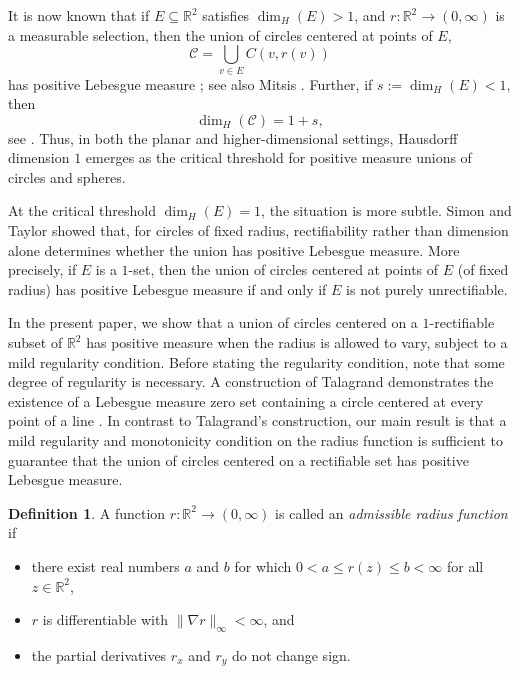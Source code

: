 \documentclass[12pt]{amsart}
\theoremstyle{definition}
\newtheorem{definition}[theorem]{Definition}
\numberwithin{equation}{section}
\newcommand{\R}{\mathbb{R}}
\begin{document}
It is now known that if $E\subseteq \R^2$ satisfies $\dim_H(E) >1$, 
and $r:\R^2\rightarrow (0,\infty)$ is a measurable selection, 
then the union of circles centered at points of $E$, 
$$\mathcal{C}= \bigcup_{v\in E}C(v,r(v))$$
has positive Lebesgue measure \cite{Wolff2000}; see also Mitsis \cite{Mitsis1999}. Further, if $s:= \dim_H(E)<1$, then 
$$\dim_H(\mathcal{C}) = 1+s,$$ see \cite{Oberlin2007}. 
Thus, in both the planar and higher-dimensional settings, Hausdorff dimension $1$ emerges as the critical threshold for positive measure unions of circles and spheres.


At the critical threshold $\dim_H(E)=1$, the situation is more subtle. Simon and Taylor \cite{ST2022} showed that, for circles of fixed radius, rectifiability rather than dimension alone determines whether the union has positive Lebesgue measure. More precisely, 
if $E$ is a $1$-set, then the union of circles centered at points of $E$ (of fixed radius) has positive Lebesgue measure if and only if $E$ is not purely unrectifiable. 


In the present paper, we show that a union of circles centered on a $1$-rectifiable subset of $\mathbb{R}^2$ has positive measure when the radius is allowed to vary, subject to a mild regularity condition. Before stating the regularity condition, note that some degree of regularity is necessary. A construction of Talagrand demonstrates the existence of a Lebesgue measure zero set containing a circle centered at every point of a line \cite{Talagrand1980}. 
In contrast to Talagrand's construction, our main result is that a mild regularity and monotonicity condition on the radius function is sufficient to guarantee that the union of circles centered on a rectifiable set has positive Lebesgue measure. 

\begin{definition}
    A function $r : \mathbb{R}^2 \to (0, \infty)$ is called an \emph{admissible radius function} if
    \begin{itemize}
        \item there exist real numbers $a$ and $b$ for which $0 < a \le r(z) \le b < \infty$ for all $z \in \mathbb{R}^2$,
        \item $r$ is differentiable with $\|\nabla r\|_\infty  < \infty$, and 
        \item the partial derivatives $r_x$ and $r_y$ do not change sign.
    \end{itemize}
\end{definition}
\end{document}
